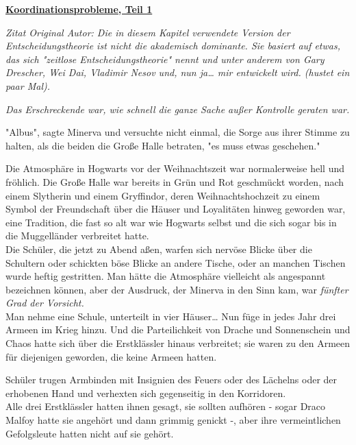 

\hypertarget{koordinationsprobleme-teil-1}{%

\textbf{\uline{Koordinationsprobleme, Teil 1}}

\emph{Zitat Original Autor: Die in diesem Kapitel verwendete Version der Entscheidungstheorie ist nicht die akademisch dominante. Sie basiert auf etwas, das sich "zeitlose Entscheidungstheorie" nennt und unter anderem von Gary Drescher, Wei Dai, Vladimir Nesov und, nun ja… mir entwickelt wird. (hustet ein paar Mal).}

\emph{Das Erschreckende war, wie schnell die ganze Sache außer Kontrolle geraten war.}

"Albus", sagte Minerva und versuchte nicht einmal, die Sorge aus ihrer Stimme zu halten, als die beiden die Große Halle betraten, "es muss etwas geschehen."

Die Atmosphäre in Hogwarts vor der Weihnachtszeit war normalerweise hell und fröhlich. Die Große Halle war bereits in Grün und Rot geschmückt worden, nach einem Slytherin und einem Gryffindor, deren Weihnachtshochzeit zu einem Symbol der Freundschaft über die Häuser und Loyalitäten hinweg geworden war, eine Tradition, die fast so alt war wie Hogwarts selbst und die sich sogar bis in die Muggelländer verbreitet hatte.\\ Die Schüler, die jetzt zu Abend aßen, warfen sich nervöse Blicke über die Schultern oder schickten böse Blicke an andere Tische, oder an manchen Tischen wurde heftig gestritten. Man hätte die Atmosphäre vielleicht als angespannt bezeichnen können, aber der Ausdruck, der Minerva in den Sinn kam, war \emph{fünfter Grad der Vorsicht.}\\ Man nehme eine Schule, unterteilt in vier Häuser… Nun füge in jedes Jahr drei Armeen im Krieg hinzu. Und die Parteilichkeit von Drache und Sonnenschein und Chaos hatte sich über die Erstklässler hinaus verbreitet; sie waren zu den Armeen für diejenigen geworden, die keine Armeen hatten.

Schüler trugen Armbinden mit Insignien des Feuers oder des Lächelns oder der erhobenen Hand und verhexten sich gegenseitig in den Korridoren.\\ Alle drei Erstklässler hatten ihnen gesagt, sie sollten aufhören - sogar Draco Malfoy hatte sie angehört und dann grimmig genickt -, aber ihre vermeintlichen Gefolgsleute hatten nicht auf sie gehört.

}
